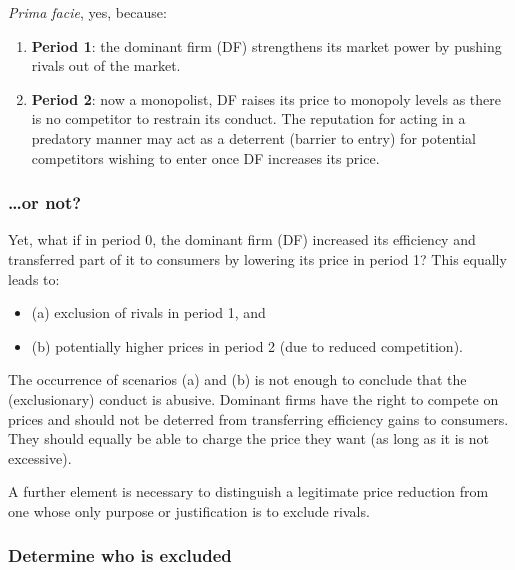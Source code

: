             \textit{Prima facie}, yes, because:

            \begin{enumerate}
                \item \textbf{Period 1}: the dominant firm (DF) strengthens its market power by pushing rivals out of the market.
                \item \textbf{Period 2}: now a monopolist, DF raises its price to monopoly levels as there is no competitor to restrain its conduct. The reputation for acting in a predatory manner may act as a deterrent (barrier to entry) for potential competitors wishing to enter once DF increases its price.
            \end{enumerate}


        \subsubsection{…or not?}

            Yet, what if in period 0, the dominant firm (DF) increased its efficiency and transferred part of it to consumers by lowering its price in period 1? This equally leads to:
    
            \begin{itemize}
                \item (a) exclusion of rivals in period 1, and
                \item (b) potentially higher prices in period 2 (due to reduced competition).
            \end{itemize}
            
            The occurrence of scenarios (a) and (b) is not enough to conclude that the (exclusionary) conduct is abusive. Dominant firms have the right to compete on prices and should not be deterred from transferring efficiency gains to consumers. They should equally be able to charge the price they want (as long as it is not excessive).
            
            A further element is necessary to distinguish a legitimate price reduction from one whose only purpose or justification is to exclude rivals.

        \subsubsection{Determine who is excluded}

